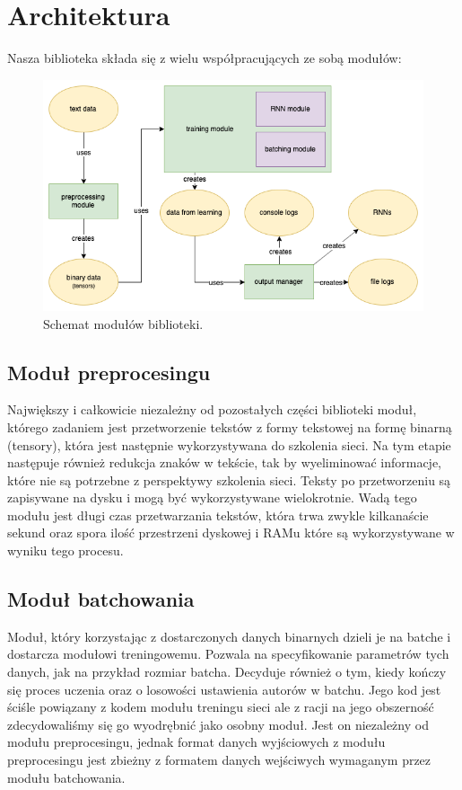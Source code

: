 \newpage
\section{Architektura}
Nasza biblioteka składa się z wielu współpracujących ze sobą modułów:
\begin{figure}[!ht]
\includegraphics[width=\linewidth]{./images/modules.png}
\caption{Schemat modułów biblioteki.}
\label{fig:test3}
\end{figure}

\subsection{Moduł preprocesingu}
Największy i całkowicie niezależny od pozostałych części biblioteki moduł, którego zadaniem jest
przetworzenie tekstów z formy tekstowej na formę binarną (tensory), która jest następnie wykorzystywana
do szkolenia sieci. Na tym etapie następuje również redukcja znaków w tekście, tak by wyeliminować
informacje, które nie są potrzebne z perspektywy szkolenia sieci. Teksty po przetworzeniu są
zapisywane na dysku i mogą być wykorzystywane wielokrotnie.
Wadą tego modułu jest długi czas przetwarzania tekstów, która trwa zwykle kilkanaście sekund oraz spora ilość
przestrzeni dyskowej i RAMu które są wykorzystywane w wyniku tego procesu.

\subsection{Moduł batchowania}
Moduł, który korzystając z dostarczonych danych binarnych dzieli je na batche i dostarcza modułowi treningowemu.
Pozwala na specyfikowanie parametrów tych danych, jak na przykład rozmiar batcha.
Decyduje również o tym, kiedy kończy się proces uczenia oraz o losowości ustawienia autorów w batchu.
Jego kod jest ściśle powiązany z kodem modułu treningu sieci ale z racji na jego obszerność zdecydowaliśmy
się go wyodrębnić jako osobny moduł.
Jest on niezależny od modułu preprocesingu, jednak format danych wyjściowych z modułu preprocesingu
jest zbieżny z formatem danych wejściwych wymaganym przez modułu batchowania.

